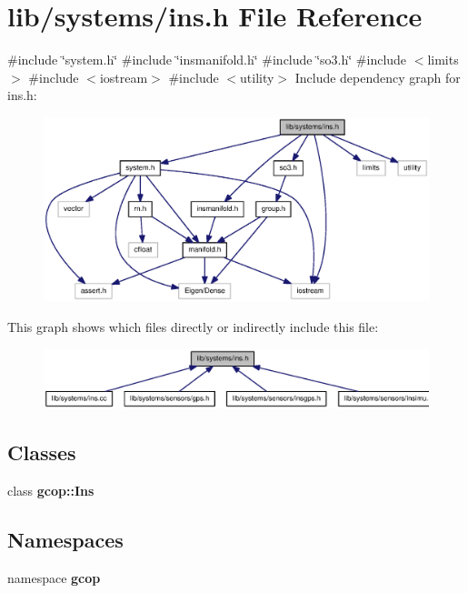 \section{lib/systems/ins.h \-File \-Reference}
\label{ins_8h}
{\ttfamily \#include \char`\"{}system.\-h\char`\"{}}\*
{\ttfamily \#include \char`\"{}insmanifold.\-h\char`\"{}}\*
{\ttfamily \#include \char`\"{}so3.\-h\char`\"{}}\*
{\ttfamily \#include $<$limits$>$}\*
{\ttfamily \#include $<$iostream$>$}\*
{\ttfamily \#include $<$utility$>$}\*
\-Include dependency graph for ins.\-h\-:\nopagebreak
\begin{figure}[H]
\begin{center}
\leavevmode
\includegraphics[width=350pt]{ins_8h__incl}
\end{center}
\end{figure}
\-This graph shows which files directly or indirectly include this file\-:\nopagebreak
\begin{figure}[H]
\begin{center}
\leavevmode
\includegraphics[width=350pt]{ins_8h__dep__incl}
\end{center}
\end{figure}
\subsection*{\-Classes}
\begin{DoxyCompactItemize}
\item 
class {\bf gcop\-::\-Ins}
\end{DoxyCompactItemize}
\subsection*{\-Namespaces}
\begin{DoxyCompactItemize}
\item 
namespace {\bf gcop}
\end{DoxyCompactItemize}
